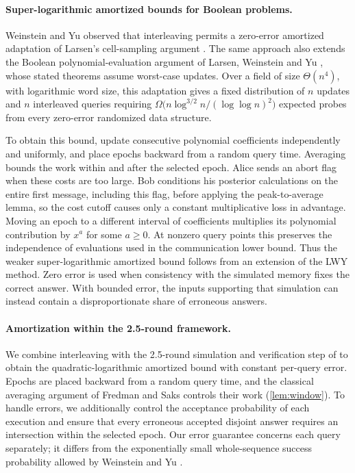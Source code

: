 \documentclass[11pt]{article}
\theoremstyle{plain}
\begin{document}
\paragraph{Super-logarithmic amortized bounds for Boolean problems.}
Weinstein and Yu \cite[Section~1.1]{weinstein_amortized_2016} observed that interleaving permits a zero-error amortized adaptation of Larsen's cell-sampling argument \cite{larsen_cell_2012}. The same approach also extends the Boolean polynomial-evaluation argument of Larsen, Weinstein and Yu \cite[Sections~4--5]{larsen_crossing_2020}, whose stated theorems assume worst-case updates. Over a field of size $\Theta(n^4)$, with logarithmic word size, this adaptation gives a fixed distribution of $n$ updates and $n$ interleaved queries requiring $\Omega\big(n\log^{3/2}n/(\log\log n)^2\big)$ expected probes from every zero-error randomized data structure.

To obtain this bound, update consecutive polynomial coefficients independently and uniformly, and place epochs backward from a random query time. Averaging bounds the work within and after the selected epoch. Alice sends an abort flag when these costs are too large. Bob conditions his posterior calculations on the entire first message, including this flag, before applying the peak-to-average lemma, so the cost cutoff causes only a constant multiplicative loss in advantage. Moving an epoch to a different interval of coefficients multiplies its polynomial contribution by $x^a$ for some $a\ge0$. At nonzero query points this preserves the independence of evaluations used in the communication lower bound. Thus the weaker super-logarithmic amortized bound follows from an extension of the LWY method. Zero error is used when consistency with the simulated memory fixes the correct answer. With bounded error, the inputs supporting that simulation can instead contain a disproportionate share of erroneous answers.

\paragraph{Amortization within the 2.5-round framework.}
We combine interleaving with the 2.5-round simulation and verification step of \cite{ko_omega_2026,ko_omegalog_2026} to obtain the quadratic-logarithmic amortized bound with constant per-query error. Epochs are placed backward from a random query time, and the classical averaging argument of Fredman and Saks \cite{fredman_cell_1989} controls their work (\cref{lem:window}). To handle errors, we additionally control the acceptance probability of each execution and ensure that every erroneous accepted disjoint answer requires an intersection within the selected epoch. Our error guarantee concerns each query separately; it differs from the exponentially small whole-sequence success probability allowed by Weinstein and Yu \cite{weinstein_amortized_2016}.
\end{document}

